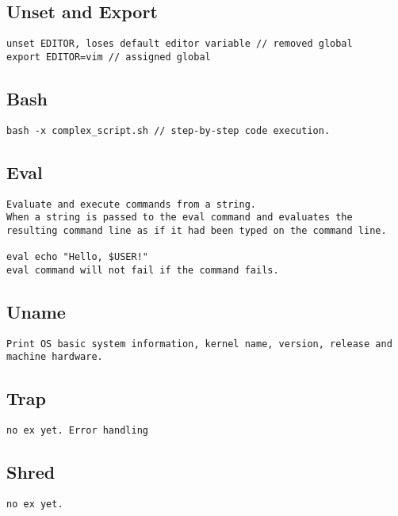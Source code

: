 \subsection{Unset and Export}

\begin{verbatim}
unset EDITOR, loses default editor variable // removed global
export EDITOR=vim // assigned global
\end{verbatim}

\subsection{Bash}

\begin{verbatim}
bash -x complex_script.sh // step-by-step code execution. 
\end{verbatim}

\subsection{Eval}

\begin{verbatim}
Evaluate and execute commands from a string. 
When a string is passed to the eval command and evaluates the resulting command line as if it had been typed on the command line.

eval echo "Hello, $USER!"
eval command will not fail if the command fails.  
\end{verbatim}

\subsection{Uname}

\begin{verbatim}
Print OS basic system information, kernel name, version, release and machine hardware. 
\end{verbatim}

\subsection{Trap}

\begin{verbatim}
no ex yet. Error handling
\end{verbatim}

\subsection{Shred}
\begin{verbatim}
no ex yet.
\end{verbatim}

